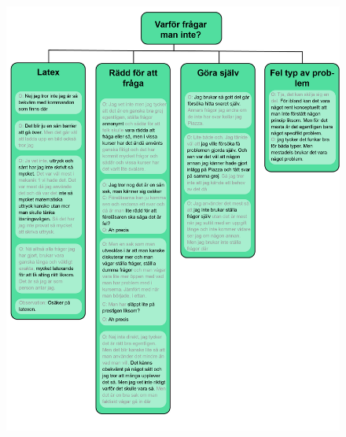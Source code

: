 \begin{figure}[hbtp]
    \centering
    \includegraphics[scale=0.75,angle=0]{appendix/appendix_green/part1b.png}
    \caption*{}
    \label{fig:nr8_part10}
\end{figure}


